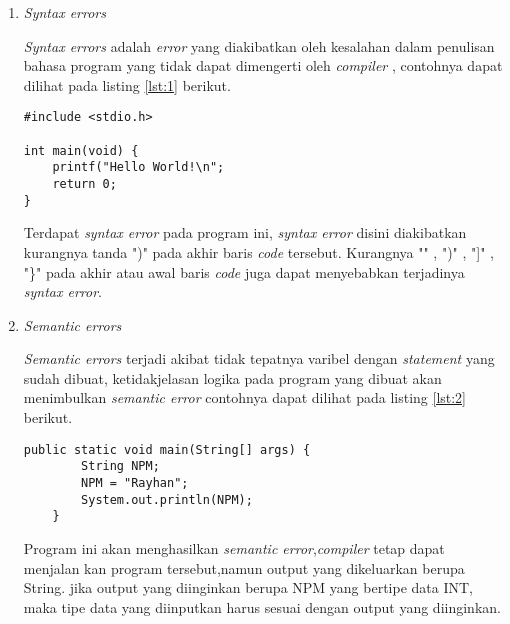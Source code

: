 \begin{enumerate}
\item 
\textit{Syntax errors}
\par 
\textit{Syntax errors} adalah \textit{error} yang diakibatkan oleh kesalahan dalam penulisan bahasa program yang tidak dapat dimengerti oleh \textit{compiler} , contohnya dapat dilihat pada listing \ref{lst:1} berikut.

\begin{lstlisting}[caption=Contoh commit standar,label={lst:1}]
#include <stdio.h>

int main(void) {
    printf("Hello World!\n";
    return 0;
}
\end{lstlisting}
 
Terdapat \textit{syntax error} pada program ini, \textit{syntax error} disini diakibatkan kurangnya tanda ")" pada akhir baris \textit{code} tersebut. Kurangnya "\;" , ")" , "]" , "\}" pada akhir atau awal baris \textit{code} juga dapat menyebabkan terjadinya \textit{syntax error}.

\item 
\textit{Semantic errors}
\par 
\textit{Semantic errors} terjadi akibat tidak tepatnya varibel dengan \textit{statement} yang sudah dibuat, ketidakjelasan logika pada program yang dibuat akan menimbulkan \textit{semantic error} contohnya dapat dilihat pada listing \ref{lst:2} berikut.

\begin{lstlisting}[caption=Contoh commit standar,label={lst:2}]
public static void main(String[] args) {	
		String NPM;		
		NPM = "Rayhan";
		System.out.println(NPM);
	}
\end{lstlisting}
\par 
Program ini akan menghasilkan \textit{semantic error},\textit{compiler} tetap dapat menjalan kan program tersebut,namun output yang dikeluarkan berupa String. jika output yang diinginkan berupa NPM yang bertipe data INT, maka tipe data yang diinputkan harus sesuai dengan output yang diinginkan.
\end{enumerate}